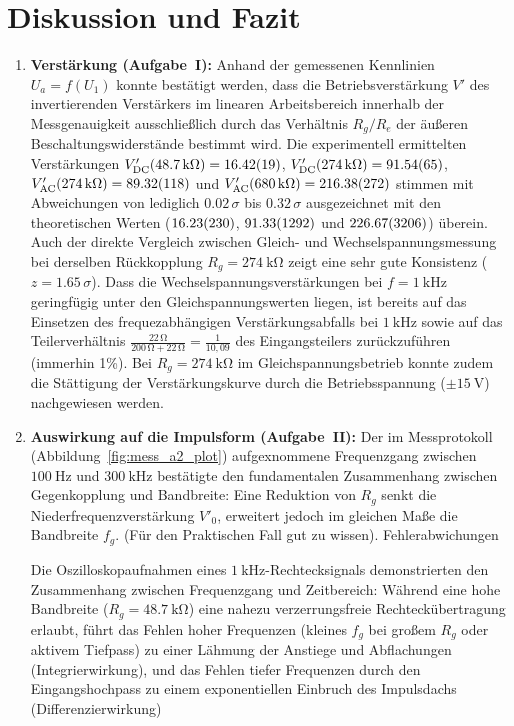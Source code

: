 \documentclass[12pt,a4paper,titlepage]{scrartcl}
\numberwithin{equation}{section}
\numberwithin{table}{section}
\numberwithin{figure}{section}
\begin{document}
\section{Diskussion und Fazit}\label{sec:Diskussion}


\begin{enumerate}
    \item \textbf{Verstärkung (Aufgabe~I):}
    Anhand der gemessenen Kennlinien $U_a = f(U_1)$ konnte bestätigt werden, dass die Betriebsverstärkung $V'$ des invertierenden Verstärkers im linearen Arbeitsbereich innerhalb der Messgenauigkeit ausschließlich durch das Verhältnis $R_g / R_e$ der äußeren Beschaltungswiderstände bestimmt wird. Die experimentell ermittelten Verstärkungen $V'_{\text{DC}}(\SI{48.7}{\kilo\ohm}) = \num{16.42 +- 0.19}$, $V'_{\text{DC}}(\SI{274}{\kilo\ohm}) = \num{91.54 +- 0.65}$, $V'_{\text{AC}}(\SI{274}{\kilo\ohm}) = \num{89.32 +- 1.18}$ und $V'_{\text{AC}}(\SI{680}{\kilo\ohm}) = \num{216.38 +- 2.72}$ stimmen mit Abweichungen von lediglich $\num{0.02}\,\sigma$ bis $\num{0.32}\,\sigma$ ausgezeichnet mit den theoretischen Werten ($\num{16.23 +- 2.30}$, $\num{91.33 +- 12.92}$ und $\num{226.67 +- 32.06}$) überein. Auch der direkte Vergleich zwischen Gleich- und Wechselspannungsmessung bei derselben Rückkopplung $R_g = \SI{274}{\kilo\ohm}$ zeigt eine sehr gute Konsistenz ($z = \num{1.65}\,\sigma$). Dass die Wechselspannungsverstärkungen bei $f = \SI{1}{\kilo\hertz}$ geringfügig unter den Gleichspannungswerten liegen, ist bereits auf das Einsetzen des frequezabhängigen Verstärkungsabfalls bei $\SI{1}{\kilo\hertz}$ sowie auf das Teilerverhältnis $\frac{22\,\si{\ohm}}{200\,\si{\ohm}+22\,\si{\ohm}} = \frac{1}{10{,}09}$ des Eingangsteilers zurückzuführen (immerhin 1\%). Bei $R_g = \SI{274}{\kilo\ohm}$ im Gleichspannungsbetrieb konnte zudem die Stättigung der Verstärkungskurve durch die Betriebsspannung ($\pm\SI{15}{\volt}$) nachgewiesen werden. 

    \item \textbf{Auswirkung auf die Impulsform (Aufgabe~II):}
    Der im Messprotokoll (Abbildung~\ref{fig:mess_a2_plot}) aufgexnommene Frequenzgang zwischen $\SI{100}{\hertz}$ und $\SI{300}{\kilo\hertz}$ bestätigte den fundamentalen Zusammenhang zwischen Gegenkopplung und Bandbreite: Eine Reduktion von $R_g$ senkt die Niederfrequenzverstärkung $V'_0$, erweitert jedoch im gleichen Maße die Bandbreite $f_g$. (Für den Praktischen Fall gut zu wissen). 
    Fehlerabwichungen

    Die Oszilloskopaufnahmen eines $\SI{1}{\kilo\hertz}$-Rechtecksignals demonstrierten den Zusammenhang zwischen Frequenzgang und Zeitbereich: Während eine hohe Bandbreite ($R_g = \SI{48.7}{\kilo\ohm}$) eine nahezu verzerrungsfreie Rechteckübertragung erlaubt, führt das Fehlen hoher Frequenzen (kleines $f_g$ bei großem $R_g$ oder aktivem Tiefpass) zu einer Lähmung der Anstiege und Abflachungen (Integrierwirkung\footnotemark[1]), und das Fehlen tiefer Frequenzen durch den Eingangshochpass zu einem exponentiellen Einbruch des Impulsdachs (Differenzierwirkung\footnotemark[1])
\end{enumerate}
\end{document}
